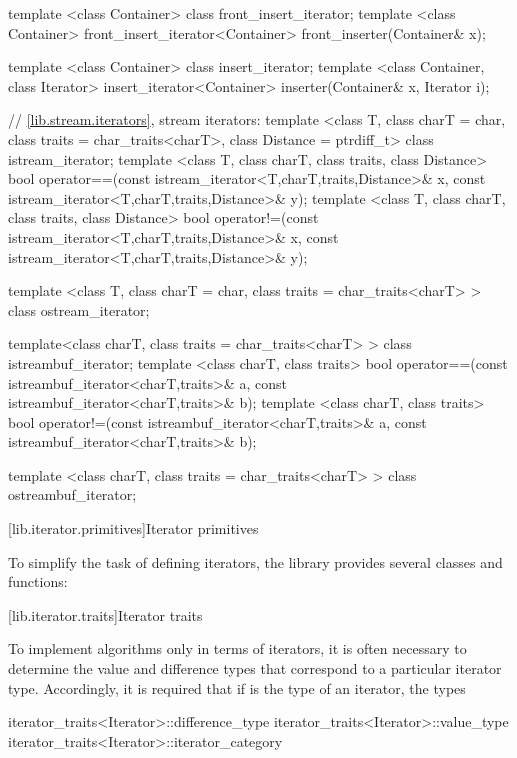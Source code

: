 \begin{codeblock}
{  template <class Container> class front_insert_iterator;
  template <class Container>
    front_insert_iterator<Container> front_inserter(Container& x);

  template <class Container> class insert_iterator;
  template <class Container, class Iterator>
    insert_iterator<Container> inserter(Container& x, Iterator i);

  // \ref{lib.stream.iterators}, stream iterators:
  template <class T, class charT = char, class traits = char_traits<charT>,
      class Distance = ptrdiff_t>
  class istream_iterator;
  template <class T, class charT, class traits, class Distance>
    bool operator==(const istream_iterator<T,charT,traits,Distance>& x,
                    const istream_iterator<T,charT,traits,Distance>& y);
  template <class T, class charT, class traits, class Distance>
    bool operator!=(const istream_iterator<T,charT,traits,Distance>& x,
                    const istream_iterator<T,charT,traits,Distance>& y);

  template <class T, class charT = char, class traits = char_traits<charT> >
      class ostream_iterator;

  template<class charT, class traits = char_traits<charT> >
    class istreambuf_iterator;
  template <class charT, class traits>
    bool operator==(const istreambuf_iterator<charT,traits>& a,
                    const istreambuf_iterator<charT,traits>& b);
  template <class charT, class traits>
    bool operator!=(const istreambuf_iterator<charT,traits>& a,
                    const istreambuf_iterator<charT,traits>& b);

  template <class charT, class traits = char_traits<charT> >
    class ostreambuf_iterator;
}
\end{codeblock}

[lib.iterator.primitives]{Iterator primitives}

\pnum
To simplify the task of defining iterators, the library provides
several classes and functions:

[lib.iterator.traits]{Iterator traits}

\pnum
To implement algorithms only in terms of iterators, it is often necessary to
determine the value and
difference types that correspond to a particular iterator type.
Accordingly, it is required that if
is the type of an iterator,
the types

\begin{codeblock}
iterator_traits<Iterator>::difference_type
iterator_traits<Iterator>::value_type
iterator_traits<Iterator>::iterator_category
\end{codeblock}

